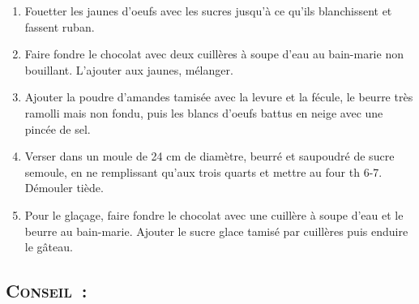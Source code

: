 \begin{enumerate}
\item Fouetter les jaunes d'oeufs avec les sucres jusqu'\`a ce qu'ils blanchissent et fassent ruban.
\item Faire fondre le chocolat avec deux cuill\`eres \`a soupe d'eau au bain-marie non bouillant. L'ajouter aux jaunes, m\'elanger.
\item Ajouter la poudre d'amandes tamis\'ee avec la levure et la f\'ecule, le beurre tr\`es ramolli mais non fondu, puis les blancs d'oeufs battus en neige avec une pinc\'ee de sel.
\item Verser dans un moule de 24 cm de diam\`etre, beurr\'e et saupoudr\'e de sucre semoule, en ne remplissant qu'aux trois quarts et mettre au four th 6-7. D\'emouler ti\`ede.
\item Pour le glaçage, faire fondre le chocolat avec une cuill\`ere \`a soupe d'eau et le beurre au bain-marie. Ajouter le sucre glace tamis\'e par cuill\`eres puis enduire le g\^ateau.

\end{enumerate}
\subsection*{\textsc{Conseil~:}}
